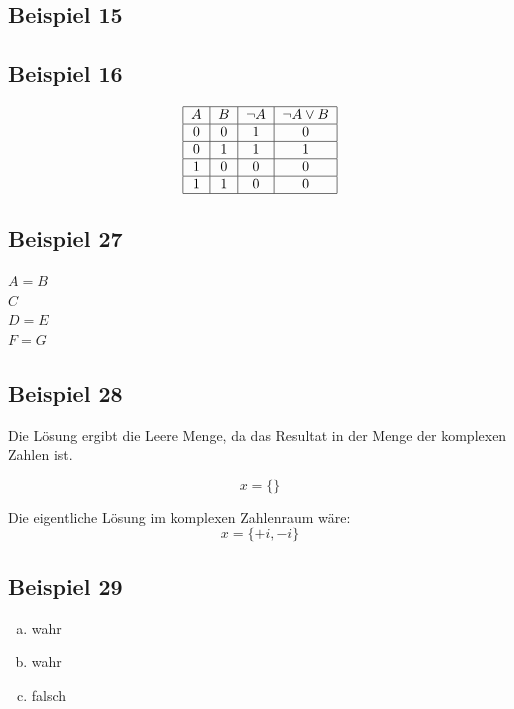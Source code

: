 \documentclass[12pt, a4paper, oneside]{article}
\begin{document}
\subsection{Beispiel 15}

\subsection{Beispiel 16}
\begin{equation*}
  \begin{tabular}{|c|c|c|c|}
    \hline
    $A$ & $B$ & $\lnot A$ & $\lnot A \lor B$ \\ \hline
    0 & 0 & 1 & 0 \\ \hline
    0 & 1 & 1 & 1 \\ \hline
    1 & 0 & 0 & 0 \\ \hline
    1 & 1 & 0 & 0 \\ \hline
  \end{tabular}
\end{equation*}

\subsection{Beispiel 27}
$A = B$ \\
$C$ \\
$D = E$ \\
$F = G$

\subsection{Beispiel 28}
Die Lösung ergibt die Leere Menge, da das Resultat in der Menge der komplexen Zahlen ist.

\begin{equation*}
  x = \{\}
\end{equation*}

Die eigentliche Lösung im komplexen Zahlenraum wäre:
\begin{equation*}
  x = \{+i, -i\}
\end{equation*}

\subsection{Beispiel 29}
\begin{enumerate}[a)]
  \item wahr
  \item wahr
  \item falsch
\end{enumerate}
\end{document}
